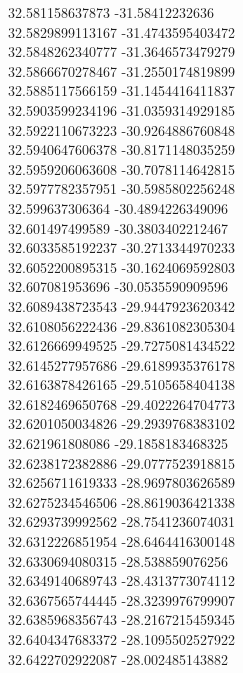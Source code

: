 {32.581158637873	-31.58412232636\\
32.5829899113167	-31.4743595403472\\
32.5848262340777	-31.3646573479279\\
32.5866670278467	-31.2550174819899\\
32.5885117566159	-31.1454416411837\\
32.5903599234196	-31.0359314929185\\
32.5922110673223	-30.9264886760848\\
32.5940647606378	-30.8171148035259\\
32.5959206063608	-30.7078114642815\\
32.5977782357951	-30.5985802256248\\
32.599637306364	-30.4894226349096\\
32.601497499589	-30.3803402212467\\
32.6033585192237	-30.2713344970233\\
32.6052200895315	-30.1624069592803\\
32.607081953696	-30.0535590909596\\
32.6089438723543	-29.9447923620342\\
32.6108056222436	-29.8361082305304\\
32.6126669949525	-29.7275081434522\\
32.6145277957686	-29.6189935376178\\
32.6163878426165	-29.5105658404138\\
32.6182469650768	-29.4022264704773\\
32.6201050034826	-29.2939768383102\\
32.621961808086	-29.1858183468325\\
32.6238172382886	-29.0777523918815\\
32.6256711619333	-28.9697803626589\\
32.6275234546506	-28.8619036421338\\
32.6293739992562	-28.7541236074031\\
32.6312226851954	-28.6464416300148\\
32.6330694080315	-28.538859076256\\
32.6349140689743	-28.4313773074112\\
32.6367565744445	-28.3239976799907\\
32.6385968356743	-28.2167215459345\\
32.6404347683372	-28.1095502527922\\
32.6422702922087	-28.002485143882\\
}
